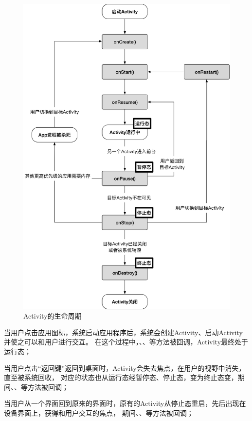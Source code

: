 \begin{figure}
	\centering
	\includegraphics[width=\textwidth]{./Figures/Activity-lifecycle.png}
	\caption{Activity的生命周期}
	\label{fig:Activity-lifecycle}
\end{figure}


当用户点击应用图标，系统启动应用程序后，系统会创建Activity、启动Activity并使之可以和用户进行交互。
在这个过程中，、、等方法被回调，Activity最终处于运行态；

当用户点击“返回键”返回到桌面时，Activity会失去焦点，在用户的视野中消失，直至被系统回收，
对应的状态也从运行态经暂停态、停止态，变为终止态变，期间、、等方法被回调；

当用户从一个界面回到原来的界面时，原有的Activity从停止态重启，先后出现在设备界面上，获得和用户交互的焦点，
期间、、等方法被回调；

